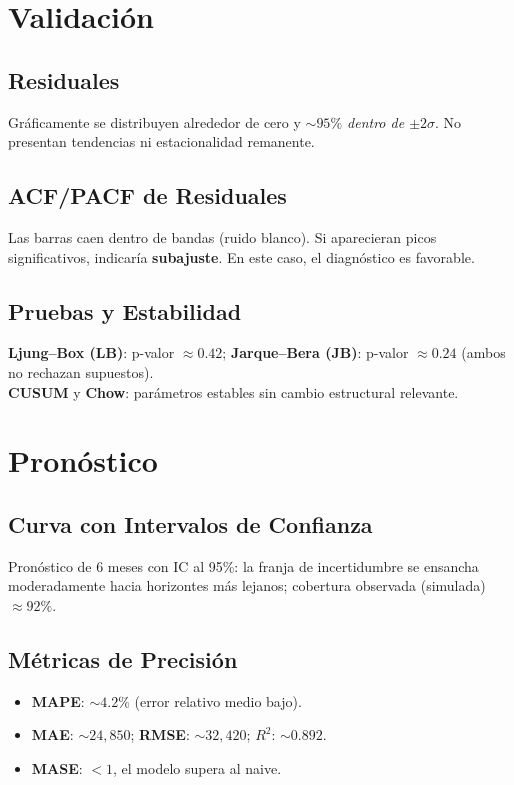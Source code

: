 \documentclass[11pt,a4paper]{article}
\begin{document}
\section{Validación}
\subsection{Residuales}
Gráficamente se distribuyen alrededor de cero y \textit{$\sim95\%$ dentro de $\pm2\sigma$}. No presentan tendencias ni estacionalidad remanente.

\subsection{ACF/PACF de Residuales}
Las barras caen dentro de bandas (ruido blanco). Si aparecieran picos significativos, indicaría \textbf{subajuste}. En este caso, el diagnóstico es favorable.

\subsection{Pruebas y Estabilidad}
\textbf{Ljung--Box (LB)}: p-valor $\approx 0.42$; \textbf{Jarque--Bera (JB)}: p-valor $\approx 0.24$ (ambos no rechazan supuestos).\\
\textbf{CUSUM} y \textbf{Chow}: parámetros estables sin cambio estructural relevante.

\section{Pronóstico}
\subsection{Curva con Intervalos de Confianza}
Pronóstico de 6 meses con IC al 95\%: la franja de incertidumbre se ensancha moderadamente hacia horizontes más lejanos; cobertura observada (simulada) $\approx92\%$.

\subsection{Métricas de Precisión}
\begin{itemize}
  \item \textbf{MAPE}: $\sim4.2\%$ (error relativo medio bajo).
  \item \textbf{MAE}: $\sim24{,}850$; \textbf{RMSE}: $\sim32{,}420$; \textbf{$R^2$}: $\sim0.892$.
  \item \textbf{MASE}: $<1$, el modelo supera al naive.
\end{itemize}
\end{document}
